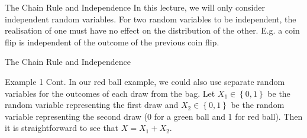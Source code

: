 \documentclass[10pt]{beamer}
\begin{document}
\begin{frame}[fragile]{The Chain Rule and Independence}
In this lecture, we will only consider independent random variables. For two random variables to be independent, the realisation of one must have no effect on the distribution of the other. E.g. a coin flip is independent of the outcome of the previous coin flip.
\end{frame}

\begin{frame}[fragile]{The Chain Rule and Independence}
\begin{exampleblock}{Example 1 Cont.}
In our red ball example, we could also use separate random variables for the outcomes of each draw from the bag. Let \(X_1 \in \left\{0, 1\right\}\) be the random variable representing the first draw and \(X_2 \in \left\{0, 1\right\}\) be the random variable representing the second draw (0 for a green ball and 1 for red ball). Then it is straightforward to see that \(X = X_1 + X_2\).


\end{exampleblock}
\end{frame}
\end{document}
